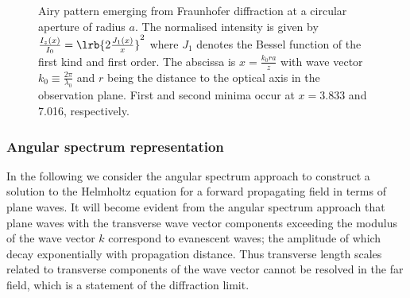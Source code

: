 \documentclass[
twoside,
openright,
titlepage,
numbers=noenddot,
headinclude,
fleqn,
a4paper,
footinclude=true,
cleardoublepage=empty,
abstractoff,
BCOR=5mm,
paper=a4,
fontsize=11pt,
british,ngerman,american,
]{scrreprt}
\begin{document}
\begin{figure} 
  \centering
  \caption[Fraunhofer diffraction at a circular aperture (Airy
  pattern).]{Airy pattern emerging from Fraunhofer diffraction at a
    circular aperture of radius $a$.  The normalised intensity is
    given by $\frac{I_z(x)}{I_0}=\lrb{2\frac{J_1(x)}{x}}^2$ where
    $J_1$ denotes the Bessel function of the first kind and first
    order.  The abscissa is $x=\frac{k_0 r a}{z}$ with wave vector
    $k_0\equiv\frac{2\pi}{\lambda_0}$ and $r$ being the distance to
    the optical axis in the observation plane.  First and second
    minima occur at $x=\num{3.833}$ and 7.016, respectively.}
  \label{fig:airy}
\end{figure}



\subsubsection{Angular spectrum representation}
\label{sec:angular-spectrum}

In the following we consider the angular spectrum approach to
construct a solution to the Helmholtz equation for a forward
propagating field in terms of plane waves.  It will become evident
from the angular spectrum approach that plane waves with the
transverse wave vector components exceeding the modulus of the wave
vector $k$ correspond to evanescent waves; the amplitude of which
decay exponentially with propagation distance.  Thus transverse length
scales related to transverse components of the wave vector cannot be
resolved in the far field, which is a statement of the diffraction
limit.
\end{document}

